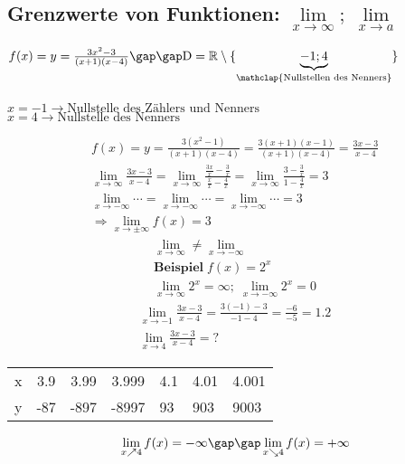 \subsection{Grenzwerte von Funktionen: $\lim\limits_{x \to \infty};\; \lim\limits_{x \to a}$}
\begin{onepage}
  $f(x) = y = \frac{3x^2 - 3}{(x + 1)(x - 4)} \gap\gap \text{D} = \mathbb{R}\setminus\{\underbrace{-1; 4}_{\mathclap{\text{Nullstellen des Nenners}}}\}$ \\\\
  $x = -1 \rightarrow \text{Nullstelle des Zählers und Nenners}$ \\
  $x = 4 \rightarrow \text{Nullstelle des Nenners}$
\end{onepage}
\begin{gather*}
  f(x) = y = \frac{3(x^2 - 1)}{(x + 1)(x - 4)} = \frac{3(x + 1)(x - 1)}{(x + 1)(x - 4)} = \frac{3x - 3}{x - 4} \\
  \lim\limits_{x \to \infty} \frac{3x - 3}{x - 4} = \lim\limits_{x \to \infty} \frac{\frac{3x}{x} - \frac{3}{x}}{\frac{x}{x} - \frac{4}{x}} = \lim\limits_{x \to \infty} \frac{3 - \frac{3}{x}}{1 - \frac{4}{x}} = 3 \\
  \lim\limits_{x \to -\infty} \cdots = \lim\limits_{x \to -\infty} \cdots = \lim\limits_{x \to -\infty} \cdots = 3 \\
  \Rightarrow \lim\limits_{x \to \pm\infty} f(x) = 3
\end{gather*}
\begin{gather*}
  \lim\limits_{x \to \infty} \neq \lim\limits_{x \to -\infty} \\
  \textbf{Beispiel}\; f(x) = 2^x \\
  \lim\limits_{x \to \infty} 2^x = \infty;\; \lim\limits_{x \to -\infty} 2^x = 0
\end{gather*}
\begin{gather*}
  \lim\limits_{x \to -1} \frac{3x - 3}{x - 4} = \frac{3(-1) - 3}{-1 - 4} = \frac{-6}{-5} = 1.2 \\
  \lim\limits_{x \to 4} \frac{3x - 3}{x - 4} = \text{?}
\end{gather*}
\begin{tabular}{l|lll|lll}
  x & \multicolumn{1}{c}{3.9} & \multicolumn{1}{c}{3.99} & \multicolumn{1}{c|}{3.999} & \multicolumn{1}{c}{4.1} & 4.01 & 4.001 \\
  y & -87                     & -897                     & -8997                      & 93                      & 903  & 9003 
\end{tabular}
\begin{gather*}
  \lim\limits_{ x \nearrow 4} f(x) = -\infty \gap\gap \lim\limits_{ x \searrow 4} f(x) = +\infty    
\end{gather*}
